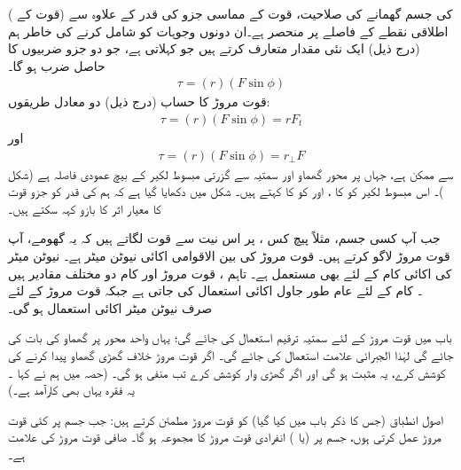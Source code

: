  کی جسم گھمانے کی صلاحیت،  قوت   کے مماسی جزو     کی قدر کے علاوہ  سے   (قوت کے ) اطلاقی نقطے کے  فاصلے پر منحصر ہے۔ان دونوں وجوہات کو شامل کرنے کی خاطر ہم (درج ذیل)  ایک نئی مقدار متعارف کرتے ہیں جو   کہلاتی ہے، جو دو جزو ضربیوں کا حاصل ضرب ہو گا۔
\begin{align}
\tau=(r)(F\sin\phi)
\end{align}
قوت مروڑ کا حساب (درج ذیل)  دو معادل طریقوں:
\begin{align}\label{مساوات_گھماو_قوت_مروڑ_ذرے_پر}
\tau=(r)(F\sin\phi)=rF_t
\end{align}
اور
\begin{align}\label{مساوات_گھماو_صافی_قوت_مروڑ_الف}
\tau=(r)(F\sin\phi)=r_{\perp}F
\end{align}
سے ممکن ہے،  جہاں     پر محور گھماو  اور   سمتیہ  سے گزرتی مبسوط لکیر  کے بیچ عمودی فاصلہ  ہے (شکل )۔ اس مبسوط لکیر کو   کا  ، اور  کو       کا کہتے ہیں۔ شکل  میں دکھایا گیا ہے کہ  ہم  کی قدر  کو  جزو قوت  کا  معیار اثر کا بازو کہہ سکتے ہیں۔

جب آپ کسی جسم،  مثلاً  پیچ کس ، پر اس نیت سے قوت لگاتے ہیں کہ یہ گھومے، آپ قوت مروڑ لاگو کرتے ہیں۔ قوت مروڑ کی بین الاقوامی اکائی نیوٹن میٹر  ہے۔  نیوٹن میٹر کی اکائی کام کے لئے بھی مستعمل ہے۔ تاہم ، قوت مروڑ اور کام دو مختلف مقادیر ہیں ۔ کام کے لئے عام طور جاول  اکائی   استعمال کی جاتی ہے جبکہ قوت مروڑ کے لئے صرف نیوٹن میٹر اکائی  استعمال ہو گی۔

باب  میں قوت مروڑ کے لئے سمتیہ ترقیم استعمال کی جائے گی؛ یہاں   واحد محور پر گھماو کی بات کی جائے گی لہٰذا  الجبرائی علامت  استعمال کی جائے گی۔ اگر  قوت مروڑ خلاف گھڑی گھماو پیدا کرنے کی کوشش کرے،  یہ مثبت ہو گی اور اگر گھڑی وار کوشش کرے تب منفی ہو گی۔ (حصہ  میں ہم نے کہا ۔ یہ فقرہ یہاں بھی  کارآمد ہے۔)

اصول انطباق (جس کا ذکر باب  میں کیا گیا)   کو قوت مروڑ مطمئن کرتے ہیں: جب جسم پر کئی قوت مروڑ عمل کرتی ہوں، جسم پر (یا )  انفرادی قوت مروڑ کا مجموعہ ہو گا۔  صافی قوت مروڑ کی علامت  ہے۔

